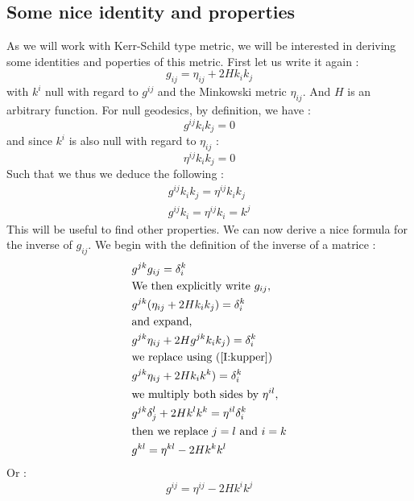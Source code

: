 \documentclass[a4paper,12pt]{article}
\theoremstyle{definition}
\begin{document}
\subsection{Some nice identity and properties}
As we will work with Kerr-Schild type metric, we will be interested in deriving some identities and poperties of this metric.
First let us write it again :
\begin{equation}
	g_{ij}=\eta_{ij}+2Hk_ik_j
\end{equation}
with $k^i$ null with regard to $g^{ij}$ and the Minkowski metric $\eta_{ij}$.
And $H$ is an arbitrary function.
For null geodesics, by definition, we have :
\begin{equation}
	g^{ij}k_ik_j=0
\end{equation}
and since $k^i$ is also null with regard to $\eta_{ij}$ :
\begin{equation}
	\eta^{ij}k_ik_j=0
\end{equation}
Such that we thus we deduce the following :
\begin{align}
	g^{ij}k_ik_j=\eta^{ij}k_ik_j \label{I:kequi}\\
	g^{ij}k_i=\eta^{ij}k_i=k^j \label{I:kupper}
\end{align}
This will be useful to find other properties.
We can now derive a nice formula for the inverse of $g_{ij}$.
We begin with the definition of the inverse of a matrice :
\begin{equation}
\begin{split}
	&g^{jk}g_{ij}=\delta^k_i \\
	&\text{We then explicitly write } g_{ij},\\
	&g^{jk}(\eta_{ij}+2Hk_ik_j)=\delta^k_i\\
	&\text{and expand,}\\
	&g^{jk}\eta_{ij}+2Hg^{jk}k_ik_j)=\delta^k_i\\
	&\text{we replace using (\ref{I:kupper})}\\
	&g^{jk}\eta_{ij}+2Hk_ik^k)=\delta^k_i\\
	&\text{we multiply both sides by }\eta^{il},\\
	&g^{jk}\delta^l_j+2Hk^lk^k=\eta^{il}\delta^k_i\\
	&\text{then we replace $j=l$ and $i=k$}\\
	&g^{kl}=\eta^{kl}-2Hk^kk^l
\end{split}
\end{equation}
Or :
\begin{equation}
	g^{ij}=\eta^{ij}-2Hk^ik^j
\end{equation}
\end{document}
